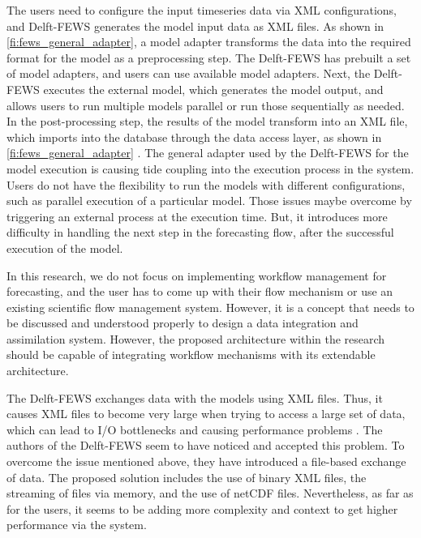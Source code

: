 The users need to configure the input timeseries data via XML configurations, and Delft-FEWS generates the model input data as XML files. As shown in \cref{fi:fews_general_adapter}, a model adapter transforms the data into the required format for the model as a preprocessing step. The Delft-FEWS has prebuilt a set of model adapters, and users can use available model adapters. Next, the Delft-FEWS executes the external model, which generates the model output, and allows users to run multiple models parallel or run those sequentially as needed. In the post-processing step, the results of the model transform into an XML file, which imports into the database through the data access layer, as shown in \cref{fi:fews_general_adapter} \cite{Werner2013TheSystem}. The general adapter used by the Delft-FEWS for the model execution is causing tide coupling into the execution process in the system. Users do not have the flexibility to run the models with different configurations, such as parallel execution of a particular model. Those issues maybe overcome by triggering an external process at the execution time. But, it introduces more difficulty in handling the next step in the forecasting flow, after the successful execution of the model. 

In this research, we do not focus on implementing workflow management for forecasting, and the user has to come up with their flow mechanism or use an existing scientific flow management system. However, it is a concept that needs to be discussed and understood properly to design a data integration and assimilation system. However, the proposed architecture within the research should be capable of integrating workflow mechanisms with its extendable architecture.

The Delft-FEWS exchanges data with the models using XML files. Thus, it causes XML files to become very large when trying to access a large set of data, which can lead to I/O bottlenecks and causing performance problems \cite{Werner2013TheSystem}. The authors of the Delft-FEWS \cite{Werner2013TheSystem} seem to have noticed and accepted this problem. To overcome the issue mentioned above, they have introduced a file-based exchange of data. The proposed solution includes the use of binary XML files, the streaming of files via memory, and the use of netCDF files. Nevertheless, as far as for the users, it seems to be adding more complexity and context to get higher performance via the system.

